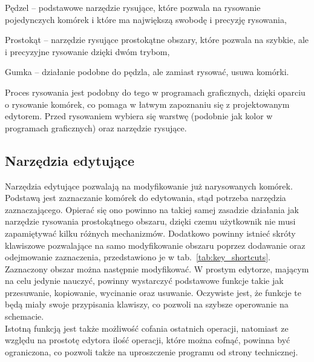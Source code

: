 \begin{citemize}
    \item Pędzel -- podstawowe narzędzie rysujące, które pozwala na rysowanie pojedynczych komórek
    i które ma największą swobodę i precyzję rysowania,
    \item Prostokąt -- narzędzie rysujące prostokątne obszary, które pozwala na szybkie,
    ale i precyzyjne rysowanie dzięki dwóm trybom,
    \item Gumka -- działanie podobne do pędzla, ale zamiast rysować, usuwa komórki.
\end{citemize}

\indent Proces rysowania jest podobny do tego w programach graficznych,
dzięki oparciu o rysowanie komórek, co pomaga w łatwym zapoznaniu się z projektowanym edytorem.
Przed rysowaniem wybiera się warstwę (podobnie jak kolor w programach graficznych) oraz narzędzie rysujące.

\subsection{Narzędzia edytujące}
\label{subsec:narzedzia_edytujace}

Narzędzia edytujące pozwalają na modyfikowanie już narysowanych komórek.
Podstawą jest zaznaczanie komórek do edytowania,
stąd potrzeba narzędzia zaznaczającego.
Opierać się ono powinno na takiej samej zasadzie działania jak narzędzie rysowania prostokątnego obszaru,
dzięki czemu użytkownik nie musi zapamiętywać kilku różnych mechanizmów.
Dodatkowo powinny istnieć skróty klawiszowe pozwalające na samo modyfikowanie obszaru poprzez dodawanie
oraz odejmowanie zaznaczenia, przedstawiono je w tab.~\ref{tab:key_shortcuts}. \\
\indent Zaznaczony obszar można następnie modyfikować.
W prostym edytorze, mającym na celu jedynie nauczyć,
powinny wystarczyć podstawowe funkcje takie jak przesuwanie, kopiowanie, wycinanie oraz usuwanie.
Oczywiste jest, że funkcje te będą miały swoje przypisania klawiszy, co pozwoli na szybsze operowanie na schemacie. \\
\indent Istotną funkcją jest także możliwość cofania ostatnich operacji,
natomiast ze względu na prostotę edytora ilość operacji, które można cofnąć, powinna być ograniczona,
co pozwoli także na uproszczenie programu od strony technicznej. %

